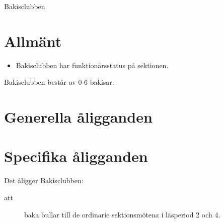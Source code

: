 \documentclass[a4paper]{article}
\begin{document}
\renewcommand{\forening}{Bakisclubben} %
\begin{foreningenv}{\forening{}} %
    \section{Allmänt}
    \begin{itemize}
        \item Bakisclubben har funktionärsstatus på sektionen.
    \end{itemize}
    Bakisclubben består av 0-6 bakisar.
    
    \section{Generella åligganden}
    \aliggsektfunkt{} %
        
    \section{Specifika åligganden}
    Det åligger \forening{}:
    \begin{description}
          \item[att] baka bullar till de ordinarie sektionsmötena i läsperiod 2 och 4. 
    \end{description}
\end{foreningenv}
\end{document}

